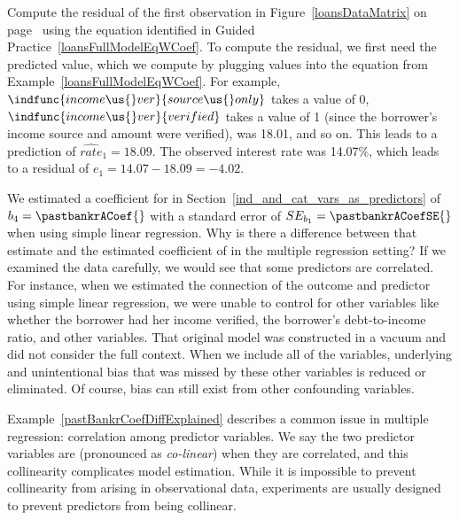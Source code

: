 \D{\newpage}

\begin{examplewrap}
\begin{nexample}{Compute the residual of the first observation
    in Figure~\ref{loansDataMatrix} on
    page~\pageref{loansDataMatrix} using the equation identified
    in Guided Practice~\ref{loansFullModelEqWCoef}.}
  To compute the residual, we first need the predicted value,
  which we compute by plugging values into the equation from
  Example~\ref{loansFullModelEqWCoef}.
  For example, $\indfunc{income\us{}ver}{source\us{}only}$
  takes a value of 0,
  $\indfunc{income\us{}ver}{verified}$ takes a value of 1
  (since the borrower's income source and amount were verified),
   was 18.01, and so on.
  This leads to a prediction of $\widehat{rate}_1 = 18.09$.
  The observed interest rate was 14.07\%, which leads to
  a residual of $e_1 = 14.07 - 18.09 = -4.02$.
\end{nexample}
\end{examplewrap}

\begin{examplewrap}
\begin{nexample}{We estimated a coefficient for
     in
    Section~\ref{ind_and_cat_vars_as_predictors}
    of $b_4 = \pastbankrACoef{}$ with a standard error
    of $SE_{b_1} = \pastbankrACoefSE{}$ when using simple
    linear regression.
    Why is there a difference between that estimate
    and the estimated coefficient of \pastbankrFullCoef{}
    in the multiple regression setting?}
  \label{pastBankrCoefDiffExplained}%
  If we examined the data carefully, we would see that
  some predictors are correlated.
  For instance, when we estimated the connection of the
  outcome  and predictor
   using simple linear regression,
  we were unable to control for other variables like
  whether the borrower had her income verified,
  the borrower's debt-to-income ratio, and other variables.
  That original model was constructed in a vacuum and did
  not consider the full context.
  When we include all of the variables,
  underlying and unintentional
  bias that was missed by these other variables is reduced
  or eliminated.
  Of course, bias can still exist from other confounding
  variables.
\end{nexample}
\end{examplewrap}

Example~\ref{pastBankrCoefDiffExplained} describes a common
issue in multiple regression: correlation among predictor
variables.
We say the two predictor variables are 
(pronounced as \emph{co-linear}) when they are correlated,
and this collinearity complicates model estimation.
While it is impossible to prevent collinearity from arising
in observational data, experiments are usually designed to
prevent predictors from being collinear.

